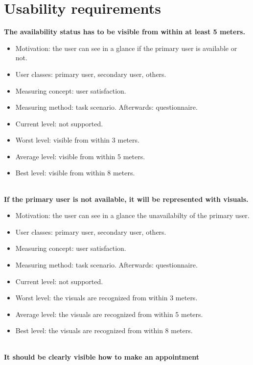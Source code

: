 \documentclass[11pt, a4paper,svglistings]{report}
\begin{document}
\section{Usability requirements}

\textbf{The availability status has to be visible from within at least 5 meters.}
\begin{itemize}
\item{Motivation: the user can see in a glance if the primary user is available or not.}
\item{User classes: primary user, secondary user, others.}
\item{Measuring concept: user satisfaction.}
\item{Measuring method: task scenario. Afterwards: questionnaire.}
\item{Current level: not supported.}
\item{Worst level: visible from within 3 meters.}
\item{Average level: visible from within 5 meters.}
\item{Best level: visible from within 8 meters. \\ \\}
\end{itemize}
\textbf{If the primary user is not available, it will be represented with visuals.}
\begin{itemize}
\item{Motivation: the user can see in a glance the unavailabilty of the primary user.}
\item{User classes: primary user, secondary user, others.}
\item{Measuring concept: user satisfaction.}
\item{Measuring method: task scenario. Afterwards: questionnaire.}
\item{Current level: not supported.}
\item{Worst level: the visuals are recognized from within 3 meters.}
\item{Average level: the visuals are recognized from within 5 meters.}
\item{Best level: the visuals are recognized from within 8 meters. \\ \\}
\end{itemize}
\textbf{It should be clearly visible how to make an appointment}
\end{document}
